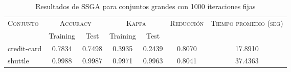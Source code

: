 \begin{table}[]
\centering
\begin{tabular}{l c c c c c c}
\hline
\multirow{2}{*}{\textsc{Conjunto}}
	& \multicolumn{2}{c}{\textsc{Accuracy}}
	& \multicolumn{2}{c}{\textsc{Kappa}}
	& \textsc{Reducción}
	& \textsc{Tiempo promedio (seg)} \\
	& Training & Test
	& Training & Test \\ 
\hline
\hline

credit-card & 0.7834 & 0.7498 & 0.3935 & 0.2439 & 0.8070 & 17.8910 \\
shuttle & 0.9988 & 0.9987 & 0.9971 & 0.9963 & 0.8041 & 37.4363 \\

\hline
\end{tabular}
\caption{Resultados de SSGA para conjuntos grandes con 1000 iteraciones fijas}
\label{res-grande-ssga}
\end{table}

